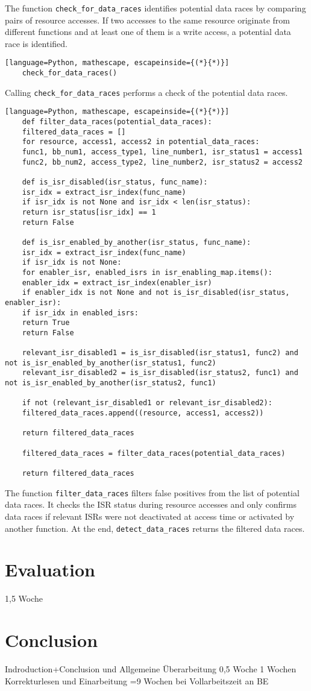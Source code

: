 \documentclass[
fancyheadings, %
%
%
]{stsreprt}
\begin{document}
{The function \texttt{check\_for\_data\_races} identifies potential data races by comparing pairs of resource accesses. If two accesses to the same resource originate from different functions and at least one of them is a write access, a potential data race is identified.

\begin{lstlisting}[language=Python, mathescape, escapeinside={(*}{*)}]
	check_for_data_races()
\end{lstlisting}

Calling \texttt{check\_for\_data\_races} performs a check of the potential data races.

\begin{lstlisting}[language=Python, mathescape, escapeinside={(*}{*)}]
	def filter_data_races(potential_data_races):
	filtered_data_races = []
	for resource, access1, access2 in potential_data_races:
	func1, bb_num1, access_type1, line_number1, isr_status1 = access1
	func2, bb_num2, access_type2, line_number2, isr_status2 = access2
	
	def is_isr_disabled(isr_status, func_name):
	isr_idx = extract_isr_index(func_name)
	if isr_idx is not None and isr_idx < len(isr_status):
	return isr_status[isr_idx] == 1
	return False
	
	def is_isr_enabled_by_another(isr_status, func_name):
	isr_idx = extract_isr_index(func_name)
	if isr_idx is not None:
	for enabler_isr, enabled_isrs in isr_enabling_map.items():
	enabler_idx = extract_isr_index(enabler_isr)
	if enabler_idx is not None and not is_isr_disabled(isr_status, enabler_isr):
	if isr_idx in enabled_isrs:
	return True
	return False
	
	relevant_isr_disabled1 = is_isr_disabled(isr_status1, func2) and not is_isr_enabled_by_another(isr_status1, func2)
	relevant_isr_disabled2 = is_isr_disabled(isr_status2, func1) and not is_isr_enabled_by_another(isr_status2, func1)
	
	if not (relevant_isr_disabled1 or relevant_isr_disabled2):
	filtered_data_races.append((resource, access1, access2))
	
	return filtered_data_races
	
	filtered_data_races = filter_data_races(potential_data_races)
	
	return filtered_data_races
\end{lstlisting}

The function \texttt{filter\_data\_races} filters false positives from the list of potential data races. It checks the ISR status during resource accesses and only confirms data races if relevant ISRs were not deactivated at access time or activated by another function. At the end, \texttt{detect\_data\_races} returns the filtered data races.


\chapter{Evaluation}
1,5 Woche 
\chapter{Conclusion}
Indroduction+Conclusion und Allgemeine Überarbeitung 0,5 Woche
1 Wochen Korrekturlesen und Einarbeitung
=9 Wochen bei Vollarbeitszeit an BE
\appendix
}
\backmatter{}
\end{document}
